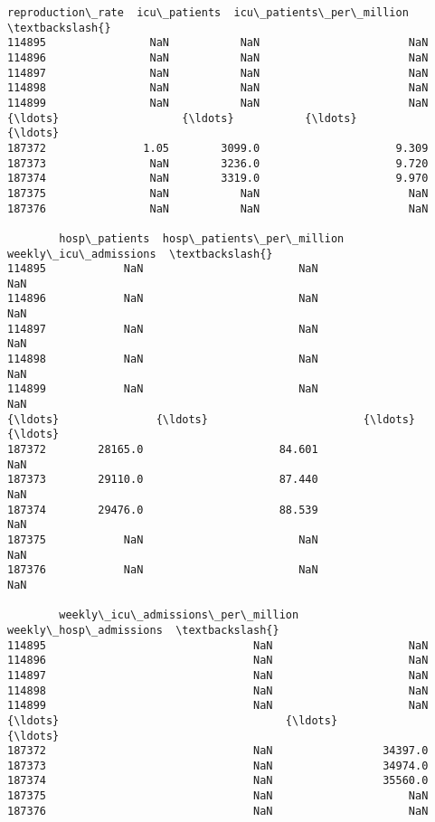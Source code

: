 \documentclass[11pt]{article}
\begin{document}
\begin{tcolorbox}[breakable, size=fbox, boxrule=.5pt, pad at break*=1mm, opacityfill=0]
\begin{Verbatim}[commandchars=\\\{\}]
        reproduction\_rate  icu\_patients  icu\_patients\_per\_million  \textbackslash{}
114895                NaN           NaN                       NaN
114896                NaN           NaN                       NaN
114897                NaN           NaN                       NaN
114898                NaN           NaN                       NaN
114899                NaN           NaN                       NaN
{\ldots}                   {\ldots}           {\ldots}                       {\ldots}
187372               1.05        3099.0                     9.309
187373                NaN        3236.0                     9.720
187374                NaN        3319.0                     9.970
187375                NaN           NaN                       NaN
187376                NaN           NaN                       NaN

        hosp\_patients  hosp\_patients\_per\_million  weekly\_icu\_admissions  \textbackslash{}
114895            NaN                        NaN                    NaN
114896            NaN                        NaN                    NaN
114897            NaN                        NaN                    NaN
114898            NaN                        NaN                    NaN
114899            NaN                        NaN                    NaN
{\ldots}               {\ldots}                        {\ldots}                    {\ldots}
187372        28165.0                     84.601                    NaN
187373        29110.0                     87.440                    NaN
187374        29476.0                     88.539                    NaN
187375            NaN                        NaN                    NaN
187376            NaN                        NaN                    NaN

        weekly\_icu\_admissions\_per\_million  weekly\_hosp\_admissions  \textbackslash{}
114895                                NaN                     NaN
114896                                NaN                     NaN
114897                                NaN                     NaN
114898                                NaN                     NaN
114899                                NaN                     NaN
{\ldots}                                   {\ldots}                     {\ldots}
187372                                NaN                 34397.0
187373                                NaN                 34974.0
187374                                NaN                 35560.0
187375                                NaN                     NaN
187376                                NaN                     NaN


\end{Verbatim}
\end{tcolorbox}
\end{document}

